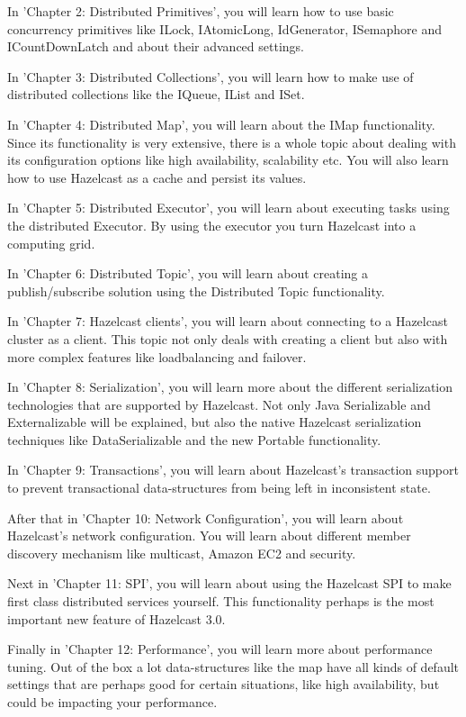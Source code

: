 In 'Chapter 2: Distributed Primitives', you will learn how to use basic concurrency primitives like ILock, IAtomicLong, IdGenerator, ISemaphore and ICountDownLatch and about their advanced settings.

In 'Chapter 3: Distributed Collections', you will learn how to make use of distributed collections like the IQueue, IList and ISet.

In 'Chapter 4: Distributed Map', you will learn about the IMap functionality. Since its functionality is very extensive, there is a whole topic about dealing with its configuration options like high availability, scalability etc. You will also learn how to use Hazelcast as a cache and persist its values.

In 'Chapter 5: Distributed Executor', you will learn about executing tasks using the distributed Executor. By using  the executor you turn Hazelcast into a computing grid. 

In 'Chapter 6: Distributed Topic', you will learn about creating a publish/subscribe solution using the Distributed Topic functionality.

In 'Chapter 7: Hazelcast clients', you will learn about connecting to a Hazelcast cluster as a client. This topic not only deals with creating a client but also with more complex features like loadbalancing and failover.

In 'Chapter 8: Serialization', you will learn more about the different serialization technologies that are supported by Hazelcast. Not only Java Serializable and Externalizable will be explained, but also the native Hazelcast serialization techniques like DataSerializable and the new Portable functionality.

In 'Chapter 9: Transactions', you will learn about Hazelcast's transaction support to prevent transactional data-structures from being left in inconsistent state.

After that in 'Chapter 10: Network Configuration', you will learn about Hazelcast's network configuration. You will learn about different member discovery mechanism like multicast, Amazon EC2 and security. 

Next in 'Chapter 11: SPI', you will learn about using the Hazelcast SPI to make first class distributed services yourself. This functionality perhaps is the most important new feature of Hazelcast 3.0.

Finally in 'Chapter 12: Performance', you will learn more about performance tuning.  Out of the box a lot data-structures like the map have all kinds of default settings that are perhaps good for certain situations, like high availability, but could be impacting your performance. 

